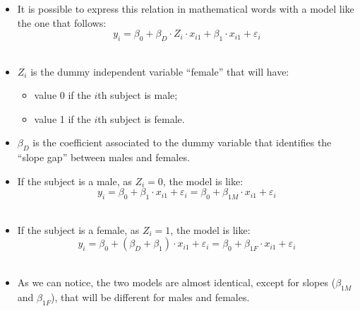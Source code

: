 \begin{frame}
  \vspace*{.25cm}
  \begin{itemize}
    \item It is possible to express this relation in mathematical words with a model like the one that follows:
    \vspace{-0.3cm} $$y_i = \beta_0 + \beta_D \cdot Z_i \cdot x_{i1} + \beta_1 \cdot x_{i1} + \varepsilon_i $$\\
    \vspace{0.2cm}
    \item $Z_i$ is the dummy independent variable ``female'' that will have:
    \begin{itemize}
      \item value 0 if the $i$th subject is male;
      \item value 1 if the $i$th subject is female.
    \end{itemize}
    \vspace{0.25cm}
    \item $ \beta_D $ is the coefficient associated to the dummy variable that identifies the ``slope gap'' between males and females.
  \end{itemize}
\end{frame}

\begin{frame}
  \vspace*{.25cm}
  \begin{itemize}
    \item If the subject is a male, as $ Z_i= 0 $, the model is like:
      \vspace{-0.25cm} $$ y_i = \beta_0 + \beta_1 \cdot x_{i1} + \varepsilon_i = \beta_0 + \beta_{1M} \cdot x_{i1} + \varepsilon_i $$ \\
    \vspace{0.25cm}
    \item If the subject is a female, as $ Z_i=1 $, the model is like:
      \vspace{-0.5cm} $$ y_i = \beta_0 + (\beta_D + \beta_1) \cdot x_{i1} + \varepsilon_i = \beta_0 + \beta_{1F} \cdot x_{i1} + \varepsilon_i$$ \\
    \vspace{0.25cm}
    \item As we can notice, the two models are almost identical, except for slopes ($\beta_{1M}$ and $\beta_{1F}$), that will be different for males and females.
\end{itemize}
\end{frame}


